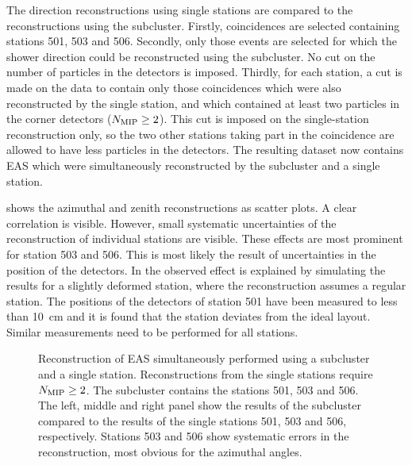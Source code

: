 The direction reconstructions using single stations are compared to the
reconstructions using the subcluster.
Firstly, coincidences are selected containing stations 501, 503 and 506.
Secondly, only those events are selected for which the shower direction could be
reconstructed using the subcluster. No cut on the number of particles in the
detectors is imposed. Thirdly, for each station, a cut is made on the data to
contain only those coincidences which were also reconstructed by the single
station, and which contained at least two particles in the corner detectors
($N_\mathrm{\mip} \geq 2$). This cut is imposed on the single-station
reconstruction only, so the two other stations taking part in the coincidence
are allowed to have less particles in the detectors.
The resulting dataset now contains EAS which were simultaneously reconstructed
by the subcluster and a single station.

 shows the azimuthal and zenith
reconstructions as scatter plots.  A clear correlation is visible.  However,
small systematic uncertainties of the reconstruction of individual stations are
visible.  These effects are most prominent for station 503 and 506.  This is
most likely the result of uncertainties in the position of the detectors.  In
\cite{Bosboom:2011} the observed effect is explained by simulating the results
for a slightly deformed station, where the reconstruction assumes a regular
station. The positions of the detectors of station 501 have been measured to
less than \SI{10}{\centi\meter} and it is found that the station deviates from
the ideal layout. Similar measurements need to be performed for all stations.

\begin{figure}
\centering
{
\longprocess{}
\vspace{1cm}
\longprocess{}
}
\caption{Reconstruction of EAS simultaneously performed using a subcluster
and a single station. Reconstructions from the single stations require
$N_\mathrm{\mip} \geq 2$. The subcluster contains the stations 501, 503
and 506.  The left, middle and right panel show the results of the
subcluster compared to the results of the single stations 501, 503 and
506, respectively.  Stations 503 and 506 show systematic errors in the
reconstruction, most obvious for the azimuthal angles.}
\label{fig:sp-results-comparison}
\end{figure}

